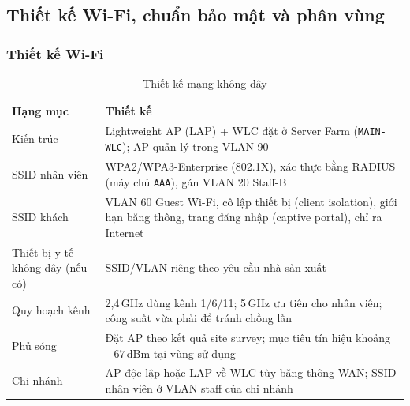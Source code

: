 \subsection{Thiết kế Wi-Fi, chuẩn bảo mật và phân vùng}

\subsubsection{Thiết kế Wi-Fi}
\begin{small}
\setlength{\tabcolsep}{4pt}
\begin{longtable}{|p{3.2cm}|p{10.6cm}|}
\caption{Thiết kế mạng không dây} \label{tab:wifi_design} \\
\hline
\textbf{Hạng mục} & \textbf{Thiết kế} \\ \hline
\endhead
Kiến trúc & Lightweight AP (LAP) + WLC đặt ở Server Farm (\texttt{MAIN-WLC}); AP quản lý trong VLAN 90 \\ \hline
SSID nhân viên & WPA2/WPA3-Enterprise (802.1X), xác thực bằng RADIUS (máy chủ \texttt{AAA}), gán VLAN 20 Staff-B \\ \hline
SSID khách & VLAN 60 Guest Wi-Fi, cô lập thiết bị (client isolation), giới hạn băng thông, trang đăng nhập (captive portal), chỉ ra Internet \\ \hline
Thiết bị y tế không dây (nếu có) & SSID/VLAN riêng theo yêu cầu nhà sản xuất \\ \hline
Quy hoạch kênh & 2,4\,GHz dùng kênh 1/6/11; 5\,GHz ưu tiên cho nhân viên; công suất vừa phải để tránh chồng lấn \\ \hline
Phủ sóng & Đặt AP theo kết quả site survey; mục tiêu tín hiệu khoảng $-67$\,dBm tại vùng sử dụng \\ \hline
Chi nhánh & AP độc lập hoặc LAP về WLC tùy băng thông WAN; SSID nhân viên ở VLAN staff của chi nhánh \\ \hline
\end{longtable}
\end{small}

